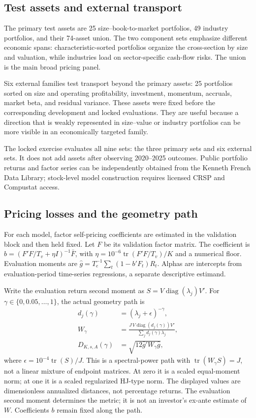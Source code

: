 \subsection{Test assets and external transport}

The primary test assets are 25 size--book-to-market portfolios, 49 industry portfolios, and their 74-asset union. The two component sets emphasize different economic spans: characteristic-sorted portfolios organize the cross-section by size and valuation, while industries load on sector-specific cash-flow risks. The union is the main broad pricing panel.

Six external families test transport beyond the primary assets: 25 portfolios sorted on size and operating profitability, investment, momentum, accruals, market beta, and residual variance. These assets were fixed before the corresponding development and locked evaluations. They are useful because a direction that is weakly represented in size--value or industry portfolios can be more visible in an economically targeted family.

The locked exercise evaluates all nine sets: the three primary sets and six external sets. It does not add assets after observing 2020--2025 outcomes. Public portfolio returns and factor series can be independently obtained from the Kenneth French Data Library; stock-level model construction requires licensed CRSP and Compustat access.

\subsection{Pricing losses and the geometry path}

For each model, factor self-pricing coefficients are estimated in the validation block and then held fixed. Let $F$ be its validation factor matrix. The coefficient is $b=(F'F/T_v+\eta I)^{-1}\bar F$, with $\eta=10^{-6}\operatorname{tr}(F'F/T_v)/K$ and a numerical floor. Evaluation moments are $\hat g=T_e^{-1}\sum_t(1-b'F_t)R_t$. Alphas are intercepts from evaluation-period time-series regressions, a separate descriptive estimand.

Write the evaluation return second moment as $S=V\operatorname{diag}(\lambda_j)V'$. For $\gamma\in\{0,0.05,\ldots,1\}$, the actual geometry path is
\begin{align}
 d_j(\gamma)&=(\lambda_j+\epsilon)^{-\gamma},\\
 W_\gamma&=\frac{J\,V\operatorname{diag}(d_j(\gamma))V'}{\sum_jd_j(\gamma)\lambda_j},\\
 D_{K,s,A}(\gamma)&=\sqrt{12\hat g'W_\gamma\hat g},
\end{align}
where $\epsilon=10^{-4}\operatorname{tr}(S)/J$. This is a spectral-power path with $\operatorname{tr}(W_\gamma S)=J$, not a linear mixture of endpoint matrices. At zero it is a scaled equal-moment norm; at one it is a scaled regularized HJ-type norm. The displayed values are dimensionless annualized distances, not percentage returns. The evaluation second moment determines the metric; it is not an investor's ex-ante estimate of $W$. Coefficients $b$ remain fixed along the path.

